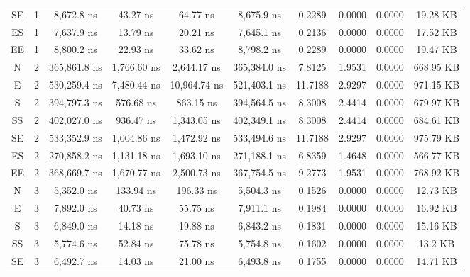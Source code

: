 \begin{sidewaystable}
\begin{tabular}{|c|c|c|c|c|c|c|c|c|c|}
        SE     & 1     & 8,672.8 ns      & 43.27 ns      & 64.77 ns      & 8,675.9 ns      & 0.2289   & 0.0000   & 0.0000   & 19.28 KB    \\
        ES     & 1     & 7,637.9 ns      & 13.79 ns      & 20.21 ns      & 7,645.1 ns      & 0.2136   & 0.0000   & 0.0000   & 17.52 KB    \\
        EE     & 1     & 8,800.2 ns      & 22.93 ns      & 33.62 ns      & 8,798.2 ns      & 0.2289   & 0.0000   & 0.0000   & 19.47 KB    \\
        N      & 2     & 365,861.8 ns    & 1,766.60 ns   & 2,644.17 ns   & 365,384.0 ns    & 7.8125   & 1.9531   & 0.0000   & 668.95 KB   \\
        E      & 2     & 530,259.4 ns    & 7,480.44 ns   & 10,964.74 ns  & 521,403.1 ns    & 11.7188  & 2.9297   & 0.0000   & 971.15 KB   \\
        S      & 2     & 394,797.3 ns    & 576.68 ns     & 863.15 ns     & 394,564.5 ns    & 8.3008   & 2.4414   & 0.0000   & 679.97 KB   \\
        SS     & 2     & 402,027.0 ns    & 936.47 ns     & 1,343.05 ns   & 402,349.1 ns    & 8.3008   & 2.4414   & 0.0000   & 684.61 KB   \\
        SE     & 2     & 533,352.9 ns    & 1,004.86 ns   & 1,472.92 ns   & 533,494.6 ns    & 11.7188  & 2.9297   & 0.0000   & 975.79 KB   \\
        ES     & 2     & 270,858.2 ns    & 1,131.18 ns   & 1,693.10 ns   & 271,188.1 ns    & 6.8359   & 1.4648   & 0.0000   & 566.77 KB   \\
        EE     & 2     & 368,669.7 ns    & 1,670.77 ns   & 2,500.73 ns   & 367,754.5 ns    & 9.2773   & 1.9531   & 0.0000   & 768.92 KB   \\
        N      & 3     & 5,352.0 ns      & 133.94 ns     & 196.33 ns     & 5,504.3 ns      & 0.1526   & 0.0000   & 0.0000   & 12.73 KB    \\
        E      & 3     & 7,892.0 ns      & 40.73 ns      & 55.75 ns      & 7,911.1 ns      & 0.1984   & 0.0000   & 0.0000   & 16.92 KB    \\
        S      & 3     & 6,849.0 ns      & 14.18 ns      & 19.88 ns      & 6,843.2 ns      & 0.1831   & 0.0000   & 0.0000   & 15.16 KB    \\
        SS     & 3     & 5,774.6 ns      & 52.84 ns      & 75.78 ns      & 5,754.8 ns      & 0.1602   & 0.0000   & 0.0000   & 13.2 KB     \\
        SE     & 3     & 6,492.7 ns      & 14.03 ns      & 21.00 ns      & 6,493.8 ns      & 0.1755   & 0.0000   & 0.0000   & 14.71 KB    \\

\end{tabular}
\end{sidewaystable}
